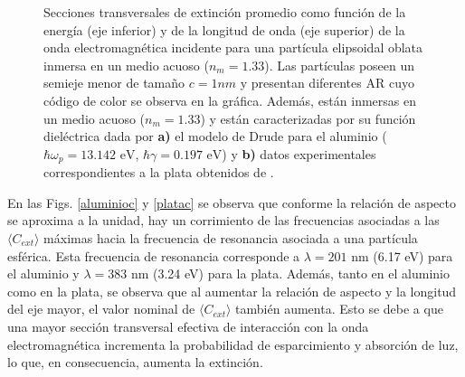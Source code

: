 \begin{figure}[h!]
	\quad%
	\caption{Secciones transversales de extinción promedio como función de la energía (eje inferior) y de la longitud de onda (eje superior) de la onda electromagnética incidente para una partícula elipsoidal oblata inmersa en un medio acuoso ($n_m=1.33$). Las partículas  poseen un semieje menor de tamaño $c=1nm$ y presentan diferentes AR cuyo código de color se observa en la gráfica. Además, están inmersas en un medio acuoso ($n_m=1.33$) y están caracterizadas por su función dieléctrica dada por  \textbf{a)} el modelo de Drude para el aluminio ($\hbar\omega_p=13.142\text{ eV}$, $\hbar\gamma=0.197\text{ eV}$) y \textbf{b)} datos experimentales correspondientes a la plata obtenidos de \cite{Plata}.}\label{aluminioplatac}
\end{figure} 

 En las Figs. \ref{aluminioc}  y \ref{platac} se observa que conforme la relación de aspecto se aproxima a la unidad, hay un corrimiento de las frecuencias asociadas a las $\langle C_{ext}\rangle$ máximas hacia la frecuencia de resonancia asociada a una partícula esférica. Esta frecuencia de resonancia corresponde a $\lambda=201\text{ nm}$ (6.17 eV) para el aluminio y $\lambda=383\text{ nm}$ (3.24 eV) para la plata. Además, tanto en el aluminio como en la plata, se observa que al aumentar la relación de aspecto y la longitud del eje mayor, el valor nominal de  $\langle C_{ext}\rangle$ también aumenta. Esto se debe a que una mayor sección transversal efectiva de interacción con la onda electromagnética incrementa la probabilidad de esparcimiento y absorción de luz, lo que, en consecuencia, aumenta la extinción.



